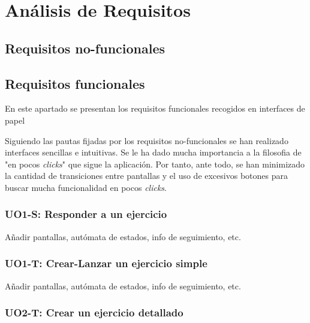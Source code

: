 
\chapter{Análisis de Requisitos}
\label{analisis-de-requisitos}

\section{Requisitos no-funcionales}
\label{analisis-de-requisitos:no-funcionales}



\section{Requisitos funcionales}
\label{analisis-de-requisitos:funcionales}

En este apartado se presentan los requisitos funcionales recogidos en interfaces de papel

Siguiendo las pautas fijadas por los requisitos no-funcionales se han realizado interfaces sencillas e intuitivas. Se le ha dado mucha importancia a la filosofia de "en pocos \textit{clicks}" que sigue la aplicación. Por tanto, ante todo, se han minimizado la cantidad de transiciones entre pantallas y el uso de excesivos botones para buscar mucha funcionalidad en pocos \textit{clicks}.\\

\subsection{UO1-S: Responder a un ejercicio}
\label{analisis-de-requisitos:funcionales:uo1s}

Añadir pantallas, autómata de estados, info de seguimiento, etc.\\

\subsection{UO1-T: Crear-Lanzar un ejercicio simple}
\label{analisis-de-requisitos:funcionales:uo1t}

Añadir pantallas, autómata de estados, info de seguimiento, etc.\\

\subsection{UO2-T: Crear un ejercicio detallado}
\label{analisis-de-requisitos:funcionales:uo2t}

